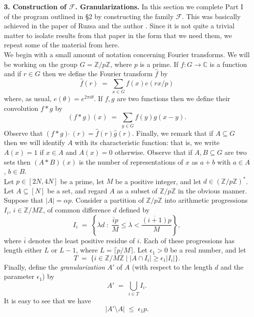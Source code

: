 \documentclass[a4paper,12pt]{article}
\begin{document}
\noindent\textbf{3. Construction of $\mathcal{F}$. Granularizations.} 
In this section we complete Part I of the program outlined in \S 2 by constructing the family $\mathcal{F}$. This was basically achieved in the paper of Ruzsa and the author \cite{GreenRuz1}. Since it is not quite a trivial matter to isolate results from that paper in the form that we need them, we repeat some of the material from \cite{GreenRuz1} here.\\[11pt]
We begin with a small amount of notation concerning Fourier transforms. We will be working on the group $G = \mathbb{Z}/p\mathbb{Z}$, where $p$ is a prime. If $f : G \rightarrow \mathbb{C}$ is a function and if $r \in G$ then we define the Fourier transform $\hat{f}$ by
\[ \hat{f}(r) \; = \; \sum_{x \in G} f(x)e(rx/p)\] where, as usual, $e(\theta) = e^{2\pi i \theta}$. If $f,g$ are two functions then we define their convolution $f \ast g$ by \[(f \ast g)(x) \; = \; \sum_{y \in G} f(y)g(x - y).\] Observe that $(f \ast g)\hat{\;}(r) = \hat{f}(r)\hat{g}(r)$. Finally, we remark that if $A \subseteq G$ then we will identify $A$ with its characteristic function: that is, we write $A(x) = 1$ if $x \in A$ and $A(x) = 0$ otherwise. Observe that if $A,B \subseteq G$ are two sets then $(A \ast B)(x)$ is the number of representations of $x$ as $a + b$ with $a \in A$, $b \in B$.\\[11pt]
Let $p \in [2N,4N]$ be a prime, let $M$ be a positive integer, and let $d \in (\mathbb{Z}/p\mathbb{Z})^{*}$. Let $A \subseteq [N]$ be a set, and regard $A$ as a subset of $\mathbb{Z}/p\mathbb{Z}$ in the obvious manner. Suppose that $|A| = \alpha p$. Consider a partition of $\mathbb{Z}/p\mathbb{Z}$ into arithmetic progressions $I_i$, $i \in \mathbb{Z}/M\mathbb{Z}$, of common difference $d$ defined by
\begin{equation}\label{decomp} I_i \; = \; \left\{\lambda d \; : \; \frac{\overline{i}p}{M} \leq \lambda < \frac{\overline{(i+1)}p}{M}\right\},\end{equation} where $\overline{i}$ denotes the least positive residue of $i$. Each of these progressions has length either $L$ or $L-1$, where $L = \lceil p/M\rceil$. Let $\epsilon_1 > 0$ be a real number, and let \[ T \; = \; \{i \in \mathbb{Z}/M\mathbb{Z} \; | \; |A \cap I_i| \geq \epsilon_1|I_i|\}.\] Finally, define the \textit{granularization} $A'$ of $A$ (with respect to the length $d$ and the parameter $\epsilon_1$) by \[A' \; = \; \bigcup_{i \in T} I_i.\] It is easy to see that we have 
\begin{equation}\label{eq101} |A' \setminus A| \; \leq \; \epsilon_1 p.\end{equation}
\end{document}
